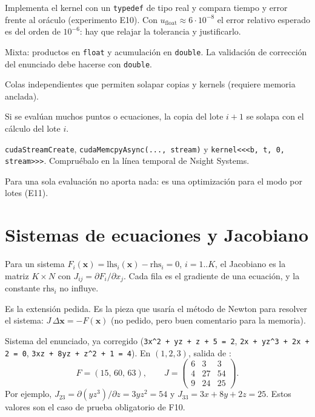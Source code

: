 \como Implementa el kernel con un \texttt{typedef} de tipo real y compara tiempo y error frente al oráculo (experimento E10). Con $u_{\text{float}}\approx6\cdot10^{-8}$ el error relativo esperado es del orden de $10^{-6}$: hay que relajar la tolerancia y justificarlo.

\alt Mixta: productos en \texttt{float} y acumulación en \texttt{double}. La validación de corrección del enunciado debe hacerse con \texttt{double}.

\que Colas independientes que permiten solapar copias y kernels (requiere memoria anclada).

\porque Si se evalúan muchos puntos o ecuaciones, la copia del lote $i+1$ se solapa con el cálculo del lote $i$.

\como \texttt{cudaStreamCreate}, \texttt{cudaMemcpyAsync(..., stream)} y \texttt{kernel<<<b, t, 0, stream>>>}. Compruébalo en la línea temporal de Nsight Systems.

\alt Para una sola evaluación no aporta nada: es una optimización para el modo por lotes (E11).

\section{Sistemas de ecuaciones y Jacobiano}\label{tema:jac}

\que Para un sistema $F_i(\mathbf{x})=\text{lhs}_i(\mathbf{x})-\text{rhs}_i=0$, $i=1..K$, el Jacobiano es la matriz $K\times N$ con $J_{ij}=\partial F_i/\partial x_j$. Cada fila es el gradiente de una ecuación, y la constante $\text{rhs}_i$ no influye.

\porque Es la extensión pedida. Es la pieza que usaría el método de Newton para resolver el sistema: $J\,\Delta\mathbf{x}=-F(\mathbf{x})$ (no pedido, pero buen comentario para la memoria).

\como Sistema del enunciado, ya corregido (\texttt{3x\^{}2 + yz + z + 5 = 2}, \texttt{2x + yz\^{}3 + 2x + 2 = 0}, \texttt{3xz + 8yz + z\^{}2 + 1 = 4}). En $(1,2,3)$, salida de :
\[
F=(15,\,60,\,63),\qquad
J=\begin{pmatrix} 6 & 3 & 3\\ 4 & 27 & 54\\ 9 & 24 & 25\end{pmatrix}.
\]
Por ejemplo, $J_{23}=\partial(yz^3)/\partial z=3yz^2=54$ y $J_{33}=3x+8y+2z=25$. Estos valores son el caso de prueba obligatorio de F10.

